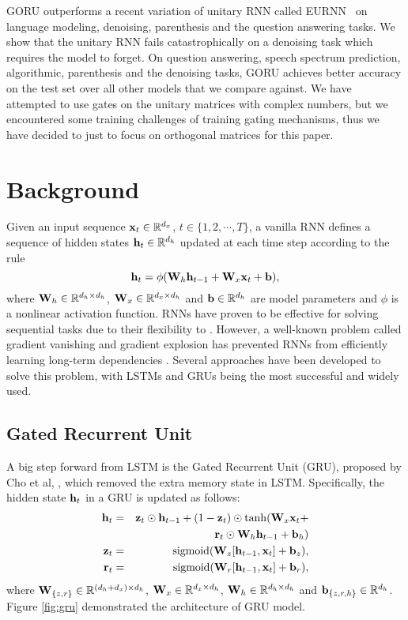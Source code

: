 \documentclass[letterpaper]{article} \usepackage{aaai18}  \usepackage{times}  \usepackage{helvet}  \usepackage{courier}  \usepackage{url}  \usepackage{graphicx}
\def\b{{\bf b}}
\def\r{{\bf r}}
\def\h{{\bf h}}
\def\x{{\bf x}}
\def\z{{\bf z}}
\def\W{{\bf W}}
\begin{document}
GORU outperforms a recent variation of unitary RNN called EURNN~\cite{jing2016tunable} on language modeling, denoising, parenthesis and the question answering tasks. We show that the unitary RNN fails catastrophically on a denoising task which requires the model to forget. On question answering, speech spectrum prediction, algorithmic, parenthesis and the denoising tasks, GORU achieves better accuracy on the test set over all other models that we compare against. We have attempted to use gates on the unitary matrices with complex numbers, but we encountered some training challenges of training gating mechanisms, thus we have decided to just to focus on orthogonal matrices for this paper.





\section{Background}


Given an input sequence $\x_t\in\mathbb{R}^{d_x}$, $t\in\{1, 2, \cdots, T\}$, a vanilla RNN defines a sequence of hidden states $\h_t\in\mathbb{R}^{d_h}$ updated at each time step according to the rule
\begin{equation}
\h_t = \phi(\W_h \h_{t-1} + \W_x \x_t + \b),
\end{equation}
where $\W_h\in \mathbb{R}^{d_h\times d_h}$, $\W_x\in \mathbb{R}^{d_x\times d_h}$ and $\b\in \mathbb{R}^{d_h}$ are model parameters and $\phi$ is a nonlinear activation function.
 RNNs have proven to be effective for solving sequential tasks due to their flexibility to . However, a well-known problem called gradient vanishing and gradient explosion has prevented RNNs from efficiently learning long-term dependencies \cite{bengio1994learning}. Several approaches have been developed to solve this problem, with LSTMs and GRUs being the most successful and widely used.

\subsection{Gated Recurrent Unit}



A big step forward from LSTM is the Gated Recurrent Unit (GRU), proposed by
Cho et al, \cite{cho2014properties}, which removed the extra memory state in LSTM. Specifically, the hidden state $\h_t$ in a GRU is updated as follows:
\begin{eqnarray}
\h_t&=&\z_t \odot \h_{t-1} + (1 - \z_t) \odot \mathrm{tanh}(\W_x \x_t +\nonumber \\ 
&& \r_t \odot\W_h \h_{t-1} + \b_h)\\
\z_t &=& \mathrm{sigmoid}(\W_{z}[\h_{t-1}, \x_{t}] + \b_{z}),\\
\r_t &=& \mathrm{sigmoid}(\W_{r}[\h_{t-1}, \x_{t}] + \b_{r}),
\end{eqnarray}
where $\W_{\{z, r\}}\in \mathbb{R}^{(d_h + d_x)\times d_h}$, $\W_x\in \mathbb{R}^{d_x\times d_h}$, $\W_h\in \mathbb{R}^{d_h\times d_h}$ and $\b_{\{z, r, h\}}\in \mathbb{R}^{d_h}$. Figure \ref{fig:gru} demonstrated the architecture of GRU model.
\end{document}
